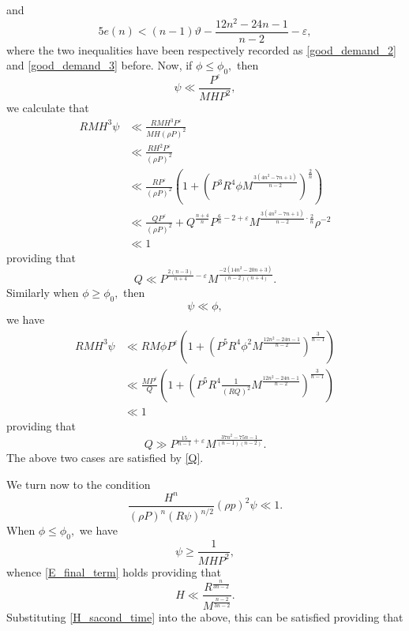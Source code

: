 \documentclass[12pt]{amsart}
\theoremstyle{definition}
\numberwithin{equation}{section}
\begin{document}
and
\begin{equation*}
    5e(n) < (n-1)\vartheta-\frac{12n^2-24n-1}{n-2}-\varepsilon,
\end{equation*}
where the two inequalities have been respectively recorded as \eqref{good_demand_2} and \eqref{good_demand_3} before.
Now, if $\phi \leq \phi_0,$ then 
$$
\psi \ll \frac{P^{\varepsilon}}{MHP^2},
$$ 
we calculate that
\begin{equation*}
    \begin{split}
        RMH^3\psi 
        &\ll \frac{RMH^3P^{\varepsilon}}{MH(\rho P)^2}\\
        &\ll \frac{RH^2P^{\varepsilon}}{(\rho P)^2}\\
        &\ll \frac{RP^\varepsilon}{(\rho P)^2}\left(1+\left(P^3R^4\phi M^{\frac{3(4n^2-7n+1)}{n-2}}\right)^{\frac{2}{n}} \right)\\
        &\ll \frac{QP^\varepsilon}{(\rho P)^2}+Q^{\frac{n+4}{n}}P^{\frac{6}{n}-2+\varepsilon}M^{\frac{3(4n^2-7n+1)}{n-2}\cdot\frac{2}{n}}\rho^{-2}\\
        & \ll 1
    \end{split}
\end{equation*}
providing that 
\begin{equation*}
    Q\ll P^{\frac{2(n-3)}{n+4}-\varepsilon}M^{\frac{-2(14n^2-20n+3)}{(n-2)(n+4)}}.
\end{equation*}
Similarly when $\phi \geq \phi_0,$ then 
$$
\psi \ll \phi,
$$ 
we have
\begin{equation*}
    \begin{split}
        RMH^3\psi 
        &\ll RM\phi P^\varepsilon\left(1+\left(P^5R^4\phi^2M^{\frac{12n^2-24n-1}{n-2}}\right)^{\frac{3}{n-1}} \right)\\
        &\ll \frac{MP^\varepsilon}{Q}\left(1+\left(P^5R^4\frac{1}{(RQ)^2}M^{\frac{12n^2-24n-1}{n-2}}\right)^{\frac{3}{n-1}} \right)\\
        & \ll 1
    \end{split}
\end{equation*}
providing that
\begin{equation*}
    Q\gg P^{\frac{15}{n-1}+\varepsilon}M^{\frac{37n^2-75n-1}{(n-1)(n-2)}}.
\end{equation*}
The above two cases are satisfied by \eqref{Q}.

We turn now to the condition
\begin{equation}
    \label{E_final_term}
    \frac{H^n}{(\rho P)^n(R\psi)^{n/2}}(\rho p)^2\psi \ll 1.
\end{equation}
When $\phi \leq \phi_0,$ we have 
$$
\psi \geq \frac{1}{MHP^2},
$$
whence \eqref{E_final_term} holds
providing that
\begin{equation*}
    H\ll \frac{R^{\frac{n}{3n-2}}}{M^{\frac{n-2}{3n-2}}}.
\end{equation*}
Substituting \eqref{H_sacond_time} into the above, this can be satisfied providing that
\end{document}
